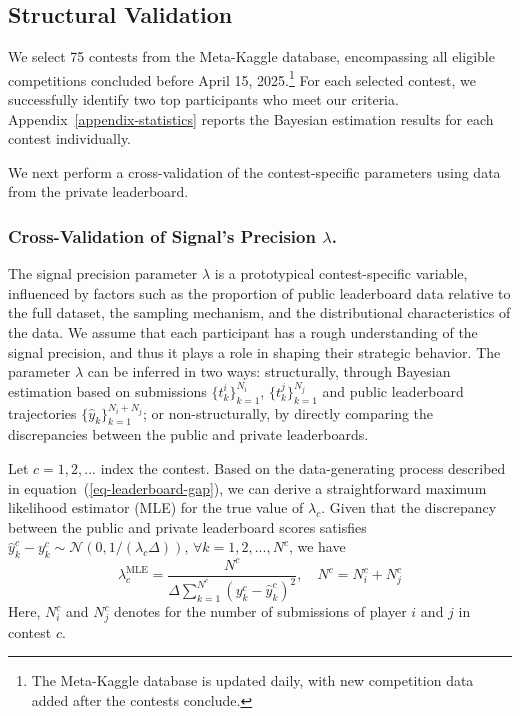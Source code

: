 \documentclass[mnsc]{informs3}
\begin{document}
\subsection{Structural Validation}


We select 75 contests from the Meta-Kaggle database, encompassing all eligible competitions concluded before April 15, 2025.\footnote{
The Meta-Kaggle database is updated daily, with new competition data added after the contests conclude.
}
For each selected contest, we successfully identify two top participants who meet our criteria.
Appendix~\ref{appendix-statistics} reports the Bayesian estimation results for each contest individually.

We next perform a cross-validation of the contest-specific parameters using data from the private leaderboard.

\subsubsection{Cross-Validation of Signal's Precision $\lambda$.}

The signal precision parameter $\lambda$ is a prototypical contest-specific variable, influenced by factors such as the proportion of public leaderboard data relative to the full dataset, the sampling mechanism, and the distributional characteristics of the data.
We assume that each participant has a rough understanding of the signal precision, and thus it plays a role in shaping their strategic behavior.
The parameter $\lambda$ can be inferred in two ways: structurally, through Bayesian estimation based on submissions $\{t^i_k\}_{k=1}^{N_i}$, $\{t^j_k\}_{k=1}^{N_j}$ and public leaderboard trajectories $\{\hat{y}_{k}\}_{k=1}^{N_i+N_j}$; or non-structurally, by directly comparing the discrepancies between the public and private leaderboards.

Let $c = {1, 2, ... }$ index the contest.
Based on the data-generating process described in equation~(\ref{eq-leaderboard-gap}), we can derive a straightforward maximum likelihood estimator (MLE) for the true value of $\lambda_c$.
Given that the discrepancy between the public and private leaderboard scores satisfies $\hat{y}_k^c - y_k^c \sim \mathcal{N}(0, 1/(\lambda_c\Delta))$, $\forall k = 1, 2, ..., N^c$, we have 
\begin{equation*}
\lambda^{\text{MLE}}_c = \frac{N^c}{\Delta\sum^{N^c}_{k=1}(y_k^c - \hat{y}_k^c)^2}, \quad N^c = N^c_i + N^c_j
\end{equation*}
Here, $N^c_i$ and $N^c_j$ denotes for the number of submissions of player $i$ and $j$ in contest $c$. 
\end{document}
